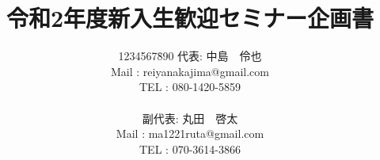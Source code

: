 



\headsep -10mm
\oddsidemargin -0mm
\textwidth 160mm
\textheight 240mm

\setcounter{secnumdepth}{6}  %

\title{令和2年度新入生歓迎セミナー企画書}
\author{
	\begin{tabbing}
		1234567\=890\kill
		代表\>:
		中島　伶也\\
		{\large Mail}\>
		{\large : reiyanakajima@gmail.com}\\
		{\large TEL}\>
		{\large : 080-1420-5859}\\\\
		副代表\>:
		丸田　啓太\\
		{\large Mail}\>
		{\large : ma1221ruta@gmail.com}\\
		{\large TEL}\>
		{\large : 070-3614-3866}\\\\
	\end{tabbing}
}
